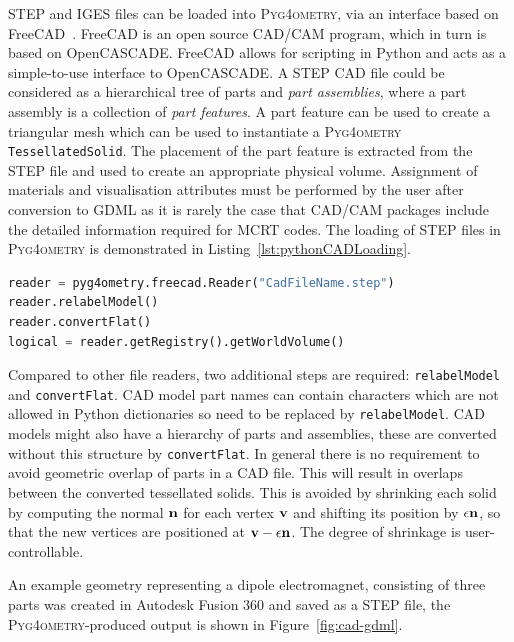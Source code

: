 \documentclass[final,5p,times,twocolumn]{elsarticle}
\newcommand{\pyinline}[1]{\lstinline[postbreak={}]{#1}}
\newcommand{\PYGEOMETRY}{\textsc{Pyg4ometry}}
\begin{document}
STEP and IGES files can be loaded into \PYGEOMETRY{}, via an interface
based on FreeCAD~\cite{FreeCAD}. FreeCAD is an open source CAD/CAM program,
which in turn is based on OpenCASCADE. FreeCAD allows for scripting in
Python and acts as a simple-to-use interface to OpenCASCADE.  A STEP CAD
file could be considered as a hierarchical tree of parts and \emph{part
  assemblies}, where a part assembly is a collection of \emph{part
  features}. A part feature can be used to create a triangular mesh which
can be used to instantiate a \PYGEOMETRY{} \pyinline{TessellatedSolid}. The
placement of the part feature is extracted from the STEP file and used to
create an appropriate physical volume. Assignment of materials and
visualisation attributes must be performed by the user after conversion to
GDML as it is rarely the case that CAD/CAM packages include the detailed
information required for MCRT codes. The loading of STEP files in
\PYGEOMETRY{} is demonstrated in Listing~\ref{lst:pythonCADLoading}.

\begin{lstlisting}[caption={A simple \PYGEOMETRY{} Python script to load a STEP file.},label={lst:pythonCADLoading}, language=Python]
reader = pyg4ometry.freecad.Reader("CadFileName.step")
reader.relabelModel()
reader.convertFlat()
logical = reader.getRegistry().getWorldVolume()
\end{lstlisting}
Compared to other file readers, two additional steps are required: \pyinline{relabelModel} and \pyinline{convertFlat}. CAD model
part names can contain characters which are not allowed in Python dictionaries so need to be replaced by \pyinline{relabelModel}.
CAD models might also have a hierarchy of parts and assemblies, these are converted without this structure by \pyinline{convertFlat}.
In general there is no requirement to avoid geometric overlap  of parts in
a CAD file. This will result in overlaps between the converted tessellated
solids. This is avoided by shrinking each solid by computing the normal ${\bf n}$  for each
vertex ${\bf v}$ and shifting its position by $\epsilon {\bf n}$, so that
the new vertices are positioned at ${\bf v} - \epsilon {\bf n}$. The degree of shrinkage
is user-controllable.

An example geometry representing a dipole electromagnet, consisting of three parts was created in Autodesk Fusion 360
and saved as a STEP file, the \PYGEOMETRY{}-produced output is shown in Figure~\ref{fig:cad-gdml}.
\end{document}
